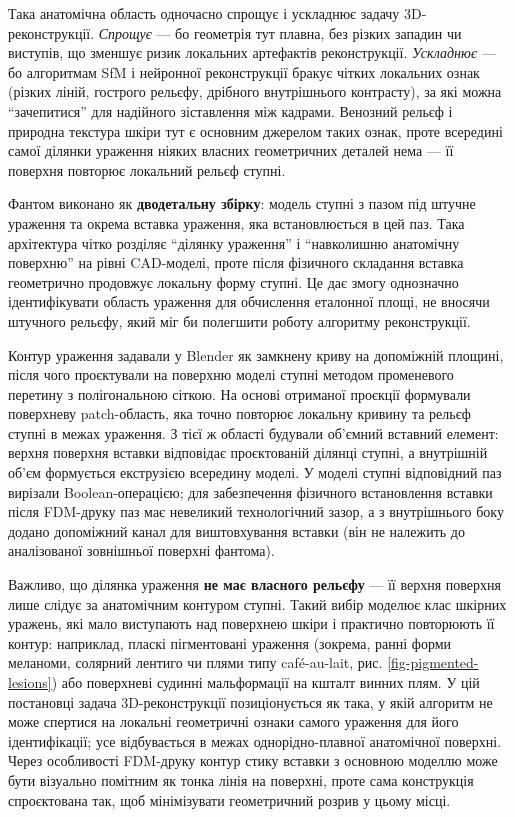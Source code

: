 \documentclass[
  ukrainian,
  10pt,
  a4paper,
  twocolumn]{article}
\begin{document}
Така анатомічна область одночасно спрощує і ускладнює задачу
3D-реконструкції. \emph{Спрощує} --- бо геометрія тут плавна, без різких
западин чи виступів, що зменшує ризик локальних артефактів
реконструкції. \emph{Ускладнює} --- бо алгоритмам SfM і нейронної
реконструкції бракує чітких локальних ознак (різких ліній, гострого
рельєфу, дрібного внутрішнього контрасту), за які можна ``зачепитися''
для надійного зіставлення між кадрами. Венозний рельєф і природна
текстура шкіри тут є основним джерелом таких ознак, проте всередині
самої ділянки ураження ніяких власних геометричних деталей нема --- її
поверхня повторює локальний рельєф ступні.

Фантом виконано як \textbf{дводетальну збірку}: модель ступні з пазом
під штучне ураження та окрема вставка ураження, яка встановлюється в цей
паз. Така архітектура чітко розділяє ``ділянку ураження'' і ``навколишню
анатомічну поверхню'' на рівні CAD-моделі, проте після фізичного
складання вставка геометрично продовжує локальну форму ступні. Це дає
змогу однозначно ідентифікувати область ураження для обчислення
еталонної площі, не вносячи штучного рельєфу, який міг би полегшити
роботу алгоритму реконструкції.

Контур ураження задавали у Blender як замкнену криву на допоміжній
площині, після чого проєктували на поверхню моделі ступні методом
променевого перетину з полігональною сіткою. На основі отриманої
проєкції формували поверхневу patch-область, яка точно повторює локальну
кривину та рельєф ступні в межах ураження. З тієї ж області будували
об'ємний вставний елемент: верхня поверхня вставки відповідає
проєктованій ділянці ступні, а внутрішній об'єм формується екструзією
всередину моделі. У моделі ступні відповідний паз вирізали
Boolean-операцією; для забезпечення фізичного встановлення вставки після
FDM-друку паз має невеликий технологічний зазор, а з внутрішнього боку
додано допоміжний канал для виштовхування вставки (він не належить до
аналізованої зовнішньої поверхні фантома).

Важливо, що ділянка ураження \textbf{не має власного рельєфу} --- її
верхня поверхня лише слідує за анатомічним контуром ступні. Такий вибір
моделює клас шкірних уражень, які мало виступають над поверхнею шкіри і
практично повторюють її контур: наприклад, пласкі пігментовані ураження
(зокрема, ранні форми меланоми, солярний лентиго чи плями типу
café-au-lait, рис. \ref{fig-pigmented-lesions}) або поверхневі судинні
мальформації на кшталт винних плям. У цій постановці задача
3D-реконструкції позиціонується як така, у якій алгоритм не може
спертися на локальні геометричні ознаки самого ураження для його
ідентифікації; усе відбувається в межах однорідно-плавної анатомічної
поверхні. Через особливості FDM-друку контур стику вставки з основною
моделлю може бути візуально помітним як тонка лінія на поверхні, проте
сама конструкція спроєктована так, щоб мінімізувати геометричний розрив
у цьому місці.
\end{document}
